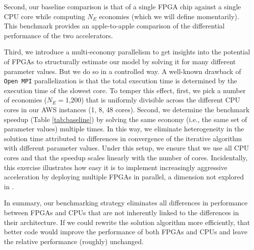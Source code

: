 \documentclass[12pt,american]{article}
\makeatletter
\newcommand{\numbeconII}{1,200\@\xspace}
\makeatother
\begin{document}
Second, our baseline comparison is that of a single FPGA chip against a single CPU core while computing $N_{E}$ economies (which we will define momentarily). This benchmark provides an apple-to-apple comparison of the differential performance of the two accelerators.

Third, we introduce a multi-economy parallelism to get insights into the potential of FPGAs to structurally estimate our model by solving it for many different parameter values. But we do so in a controlled way. A well-known drawback of \texttt{Open MPI} parallelization is that the total execution time is determined by the execution time of the slowest core. To temper this effect, first, we pick a number of economies ($N_{E}=$\numbeconII) that is uniformly divisible across the different CPU cores in our AWS instances (1, 8, 48 cores). Second, we determine the benchmark speedup (Table \ref{tab:baseline}) by solving the same economy (i.e., the same set of parameter values) multiple times. In this way, we eliminate heterogeneity in the solution time attributed to differences in convergence of the iterative algorithm with different parameter values. Under this setup, we ensure that we use all CPU cores and that the speedup scales linearly with the number of cores. Incidentally, this exercise illustrates how easy it is to implement increasingly aggressive acceleration by deploying multiple FPGAs in parallel, a dimension not explored in \cite{Peri2020}.

In summary, our benchmarking strategy eliminates all differences in performance between FPGAs and CPUs that are not inherently linked to the differences in their architecture. If we could rewrite the solution algorithm more efficiently, that better code would improve the performance of both FPGAs and CPUs and leave the relative performance (roughly) unchanged.
\end{document}
